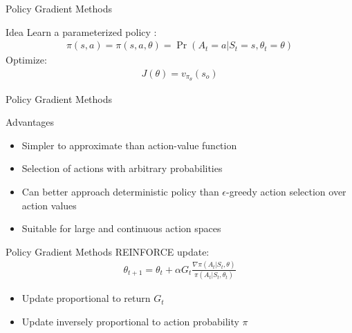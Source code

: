 \documentclass[ignorenonframetext,xcolor=x11names]{beamer}
\begin{document}
\begin{frame}{Policy Gradient Methods}
\begin{block}{Idea}
Learn a parameterized policy :
\begin{align*}
\pi(s, a) = \pi(s, a, \theta) = \Pr(A_t = a | S_t = s, \theta_t = \theta)
\end{align*}
Optimize:
\begin{align*}
J(\theta) = v_{\pi_\theta}(s_o)
\end{align*}
\end{block}
\end{frame}

\begin{frame}{Policy Gradient Methods}
\begin{block}{Advantages}
\begin{itemize}
   \item Simpler to approximate than action-value function
   \item Selection of actions with arbitrary probabilities
   \item Can better approach deterministic policy than $\epsilon$-greedy action selection over action values
   \item Suitable for large and continuous action spaces
\end{itemize}
\end{block}
\end{frame}

\begin{frame}{Policy Gradient Methods}
REINFORCE update:
\begin{align*}
\theta_{t+1} = \theta_t + \alpha G_t \frac{\nabla \pi(A_t | S_t, \theta)}{\pi(A_t | S_t, \theta_t)}
\end{align*}
\begin{itemize}
   \item Update proportional to return $G_t$
   \item Update inversely proportional to action probability $\pi$
\end{itemize}
\end{frame}
\end{document}
